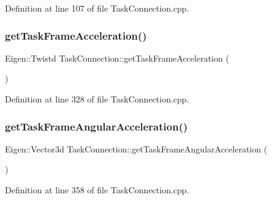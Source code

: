 Definition at line 107 of file Task\+Connection.\+cpp.

\hypertarget{classocra__recipes_1_1TaskConnection_a83e90c36f53ffda20f73b242c5de285b}{}\label{classocra__recipes_1_1TaskConnection_a83e90c36f53ffda20f73b242c5de285b} 
\subsubsection{\texorpdfstring{get\+Task\+Frame\+Acceleration()}{getTaskFrameAcceleration()}}
{\footnotesize\ttfamily Eigen\+::\+Twistd Task\+Connection\+::get\+Task\+Frame\+Acceleration (\begin{DoxyParamCaption}{ }\end{DoxyParamCaption})}



Definition at line 328 of file Task\+Connection.\+cpp.

\hypertarget{classocra__recipes_1_1TaskConnection_abae3e5305e8de9be7ccf34fdbb4d6e1a}{}\label{classocra__recipes_1_1TaskConnection_abae3e5305e8de9be7ccf34fdbb4d6e1a} 
\subsubsection{\texorpdfstring{get\+Task\+Frame\+Angular\+Acceleration()}{getTaskFrameAngularAcceleration()}}
{\footnotesize\ttfamily Eigen\+::\+Vector3d Task\+Connection\+::get\+Task\+Frame\+Angular\+Acceleration (\begin{DoxyParamCaption}{ }\end{DoxyParamCaption})}



Definition at line 358 of file Task\+Connection.\+cpp.

\hypertarget{classocra__recipes_1_1TaskConnection_a57f6e6e29aa2d09bff7c9aa7e7a322f7}{}\label{classocra__recipes_1_1TaskConnection_a57f6e6e29aa2d09bff7c9aa7e7a322f7} 
